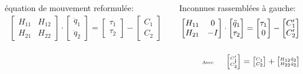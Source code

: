 \documentclass[11pt]{beamer}
\begin{document}
\begin{frame}
	\begin{columns}[T]
	\begin{column}{.5\textwidth}\footnotesize
	\begin{alertblock}{équation de mouvement reformulée:}
	  \begin{align}
	  	\begin{bmatrix}
		  H_{11} & H_{12} \\
		  H_{21} & H_{22}
		\end{bmatrix} 
		\cdot
		\begin{bmatrix}
		  \ddot{q}_{1} \\
		  \ddot{q}_{2}
		\end{bmatrix} 
		= 
		\begin{bmatrix}
		  \tau_{1} \\
		  \tau_{2}
		\end{bmatrix} 
		-
		\begin{bmatrix}
		  C_{1} \\
		  C_{2}
		\end{bmatrix} \label{equ_local_eqMvt_2}
		\end{align}
	\end{alertblock}
	\end{column}

	\begin{column}{.5\textwidth}\footnotesize
	\begin{alertblock}{Inconnues rassemblées à gauche:}
		\begin{align}
		\begin{bmatrix}
		  H_{11} & 0 \\
		  H_{21} &  -I
		\end{bmatrix} 
		\cdot
		\begin{bmatrix}
		  \ddot{q}_1 \\
		  \tau_2
		\end{bmatrix} 
		=
		\begin{bmatrix}
		  \tau_1 \\
		  0
		\end{bmatrix} 
		-
		\begin{bmatrix}
		  C'_{1} \\
		  C'_{2}
		\end{bmatrix} \label{equ_equationMvt_dynHyb2} \\
		\notag \\
		{\tiny \textnormal{Avec} \qquad
		\begin{bmatrix}
		  C'_{1} \\
		  C'_{2}
		\end{bmatrix}
		=
		\begin{bmatrix}
		  C_{1} \\
		  C_{2}
		\end{bmatrix}
		+
		\begin{bmatrix}
		  H_{12} \ddot{q}_2 \\
		  H_{22} \ddot{q}_2
		\end{bmatrix}} \label{equ_cPrime}
		\end{align}
	\end{alertblock}
	\end{column}
	\end{columns}
  
\end{frame}
\end{document}
